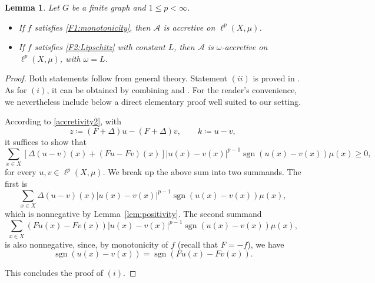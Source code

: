 \documentclass[journal]{article}
\theoremstyle{nonitalic}
\theoremstyle{nonitalic}
\theoremstyle{plain} %
\newtheorem{lemma}[theorem]{Lemma}
\numberwithin{equation}{section}
\begin{document}
\begin{lemma}\label{lem:accretivity_finite_graphp=1}
Let $G$ be a finite graph and $1\leq p<\infty$.
\begin{itemize}
\item[(i)] If     $f$ satisfies \textnormal{\ref{F1:monotonicity}}, then $\mathcal A$ is accretive on $\ell^p(X,\mu)$.
\item[(ii)] If     $f$ satisfies \textnormal{\ref{F2:Lipschitz}} with constant $L$, then $\mathcal A$ is $\omega$-accretive on $\ell^p(X,\mu)$, with $\omega = L$. 
\end{itemize}
 \end{lemma}
\begin{proof}
 Both statements follow from general theory. Statement $(ii)$ is proved in \cite[Example 2.2]{benilan1988evolution}. As for $(i)$, it can be obtained by combining \cite[Proposition 2.20]{benilan1988evolution} and \cite[Proposition 2.23]{benilan1988evolution}. For the reader’s convenience, we nevertheless include below a direct elementary proof well suited to our setting.

According to \eqref{accretivity2}, 
with 
\begin{equation}
		z \coloneqq (F+\Delta)u -  (F+\Delta)v,\qquad k \coloneqq u-v,
	\end{equation}
it suffices to show that 
\[
\sum_{x\in X} [\Delta(u-v)(x) +(Fu-Fv)(x)] |u(x)-v(x)|^{p-1}\operatorname{sgn}(u(x)-v(x))\mu(x)
\geq 0,
\]
for every $u,v\in \ell^p(X,\mu).$
We break up the above sum into two summands. The first is 
\[
\sum_{x\in X} \Delta(u-v)(x) |u(x)-v(x)|^{p-1}\operatorname{sgn}(u(x)-v(x))\mu(x),
\]
which is nonnegative by Lemma~\ref{lem:positivity}.
The second summand 
\[
\sum_{x\in X} (Fu(x)-Fv(x)) |u(x)-v(x)|^{p-1}\operatorname{sgn}(u(x)-v(x))\mu(x),
\]
is also nonnegative, since, 
by monotonicity of $f$ (recall that $F=-f$), we have
\begin{equation*}
 \operatorname{sgn}(u(x) - v(x)) = \operatorname{sgn}(Fu(x) - Fv(x)).
\end{equation*}



This concludes the proof of $(i)$.

 
\end{proof}
 
\end{document}
